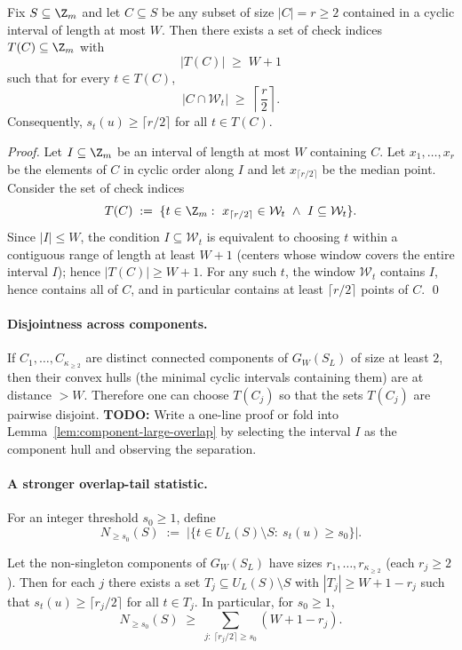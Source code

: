 \begin{lemma}
\label{lem:component-large-overlap}
Fix $S\subseteq \Z_m$ and let $C\subseteq S$ be any subset of size $|C|=r\ge 2$ contained in a cyclic interval of
length at most $W$.
Then there exists a set of check indices $T(C)\subseteq \Z_m$ with
\[
|T(C)|\;\ge\; W+1
\]
such that for every $t\in T(C)$,
\[
|C\cap \mathcal W_t|\;\ge\;\left\lceil \frac{r}{2}\right\rceil.
\]
Consequently, $s_t(u)\ge \lceil r/2\rceil$ for all $t\in T(C)$.
\end{lemma}

\begin{proof}
Let $I\subseteq \Z_m$ be an interval of length at most $W$ containing $C$.
Let $x_1,\dots,x_r$ be the elements of $C$ in cyclic order along $I$ and let $x_{\lceil r/2\rceil}$ be the median point.
Consider the set of check indices
\[
T(C)\;:=\;\{t\in \Z_m:\ x_{\lceil r/2\rceil}\in \mathcal W_t\ \wedge\ I\subseteq \mathcal W_t\}.
\]
Since $|I|\le W$, the condition $I\subseteq \mathcal W_t$ is equivalent to choosing $t$ within a contiguous range of
length at least $W+1$ (centers whose window covers the entire interval $I$); hence $|T(C)|\ge W+1$.
For any such $t$, the window $\mathcal W_t$ contains $I$, hence contains all of $C$, and in particular contains at least
$\lceil r/2\rceil$ points of $C$.
\qed
\end{proof}

\paragraph{Disjointness across components.}
If $C_1,\dots,C_{\kappa_{\ge2}}$ are distinct connected components of $G_W(S_L)$ of size at least $2$, then their convex
hulls (the minimal cyclic intervals containing them) are at distance $>W$.
Therefore one can choose $T(C_j)$ so that the sets $T(C_j)$ are pairwise disjoint. 
\noindent\textbf{TODO:} Write a one-line proof or fold into Lemma~\ref{lem:component-large-overlap} by selecting the
interval $I$ as the component hull and observing the separation.

\paragraph{A stronger overlap-tail statistic.}
For an integer threshold $s_0\ge 1$, define
\[
N_{\ge s_0}(S)\;:=\;|\{t\in U_L(S)\setminus S:\ s_t(u)\ge s_0\}|.
\]

\begin{lemma}
\label{lem:large-overlap-mass}
Let the non-singleton components of $G_W(S_L)$ have sizes $r_1,\dots,r_{\kappa_{\ge 2}}$ (each $r_j\ge 2$).
Then for each $j$ there exists a set $T_j\subseteq U_L(S)\setminus S$ with $|T_j|\ge W+1-r_j$ such that
$s_t(u)\ge \lceil r_j/2\rceil$ for all $t\in T_j$.
In particular, for $s_0\ge 1$,
\[
N_{\ge s_0}(S)\;\ge\;\sum_{j:\ \lceil r_j/2\rceil \ge s_0} (W+1-r_j).
\]
\end{lemma}

